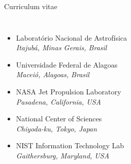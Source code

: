 \documentclass[serif,mathserif,professionalfont]{beamer}
\begin{document}
\begin{frame}{Curriculum vitae}
\begin{columns}[c]
\begin{itemize}
\item<1,2> Laborat\'{o}rio Nacional de Astrof\'{i}sica \\ 
\emph{Itajub\'{a}, Minas Gerais, Brasil}

\item<1,3> Universidade Federal de Alagoas \\
\emph{Macei\'{o}, Alagoas, Brasil}

\item<1,4> NASA Jet Propulsion Laboratory \\
\emph{Pasadena, California, USA} 

\item<1,5> National Center of Sciences \\
\emph{Chiyoda-ku, Tokyo, Japan}

\item<1,6> NIST Information Technology Lab \\
\emph{Gaithersburg, Maryland, USA} 


\end{itemize}
\end{columns}
\end{frame}
\end{document}
